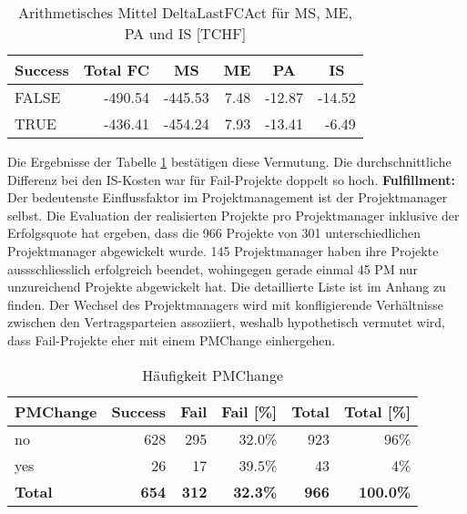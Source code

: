 \begin{table}[H]
	\centering
	\caption{Arithmetisches Mittel DeltaLastFCAct für MS, ME, PA und IS [TCHF]}
	\begin{tabular}{lrrrrr}
		\textbf{Success} & \multicolumn{1}{c}{\textbf{Total FC}} & \multicolumn{1}{c}{\textbf{MS}} & \multicolumn{1}{c}{\textbf{ME}} & \multicolumn{1}{c}{\textbf{PA}} & \multicolumn{1}{c}{\textbf{IS}}
		\\\hline
		FALSE & -490.54 & -445.53 & 7.48 & -12.87 & -14.52 \\
		TRUE  & -436.41 & -454.24 & 7.93 & -13.41 & -6.49\\
	\end{tabular}%
	\label{mdeltalastfcact}%
\end{table}%
Die Ergebnisse der Tabelle \ref{mdeltalastfcact} bestätigen diese Vermutung. Die durchschnittliche Differenz bei den IS-Kosten war für Fail-Projekte doppelt so hoch.
\newline\newline\textbf{Fulfillment:} Der bedeutenste Einflussfaktor im Projektmanagement ist der Projektmanager selbst. Die Evaluation der realisierten Projekte pro Projektmanager inklusive der Erfolgsquote hat ergeben, dass die 966 Projekte von 301 unterschiedlichen Projektmanager abgewickelt wurde. 145 Projektmanager haben ihre Projekte aussschliesslich erfolgreich beendet, wohingegen gerade einmal 45 PM nur unzureichend Projekte abgewickelt hat. Die detaillierte Liste ist im Anhang zu finden.
\newline\newline Der Wechsel des Projektmanagers wird mit konfligierende Verhältnisse zwischen den Vertragsparteien assoziiert, weshalb hypothetisch vermutet wird, dass Fail-Projekte eher mit einem PMChange einhergehen. 
\begin{table}[H]
	\centering
	\caption{Häufigkeit PMChange}
	\begin{tabular}{lrrrrr}
		\textbf{PMChange} & \multicolumn{1}{l}{\textbf{Success}} & \multicolumn{1}{l}{\textbf{Fail}} & \multicolumn{1}{l}{\textbf{Fail [\%]}} & \multicolumn{1}{l}{\textbf{Total}} &
		\multicolumn{1}{l}{\textbf{Total [\%]}} \\\hline
		no    & 628   & 295   & 32.0\% & 923 & 96\% \\
		yes   & 26    & 17    & 39.5\% & 43  & 4\% \\\hline
		\textbf{Total} & \textbf{654} & \textbf{312} & \textbf{32.3\%} & \textbf{966} & \textbf{100.0\%} \\
	\end{tabular}%
	\label{pmchange}%
\end{table}%
